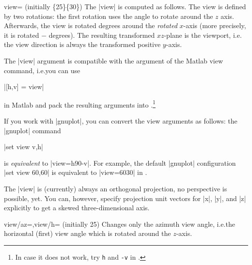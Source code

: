 {\begin{pgfplotskey}{view= (initially \{25\}\{30\})}
    The |view| is computed as follows. The view is defined by two rotations:
    the first rotation uses the  angle to rotate around the $z$
    axis. Afterwards, the view is rotated  degrees around the
    \emph{rotated} $x$-axis (more precisely, it is rotated $-$
    degrees). The resulting transformed $xz$-plane is the viewport, i.e.\@
    the view direction is always the transformed positive $y$-axis.

    The |view| argument is compatible with the argument of the
    Matlab\textregistered{} view command, i.e.\@ you can use

    |[h,v] = view|

    \noindent in Matlab and pack the resulting arguments into
    \PGFPlots.\footnote{In case it does not work, try \texttt{h} and \texttt{-v}
    in \PGFPlots{}.}

    If you work with |gnuplot|, you can convert the view arguments as follows:
    the |gnuplot| command

    |set view v,h|

    \noindent is \emph{equivalent} to |view={h}{90-v}|. For example, the
    default |gnuplot| configuration |set view 60,60| is equivalent to
    |view={60}{30}| in \PGFPlots{}.

    The |view| is (currently) always an orthogonal projection, no perspective
    is possible, yet. You can, however, specify projection unit vectors for
    |x|, |y|, and |z| explicitly to get a skewed three-dimensional axis.
\end{pgfplotskey}

\begin{pgfplotskeylist}{view/az=,view/h= (initially 25)}
    Changes only the azimuth view angle, i.e.\@ the horizontal (first) view
    angle which is rotated around the $z$-axis.
\pgfplotsexpensiveexample
\begin{codeexample}[]
\end{codeexample}

\pgfplotsexpensiveexample
\begin{codeexample}[]
\end{codeexample}


\end{pgfplotskeylist}}
